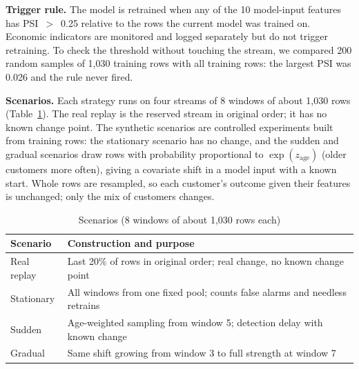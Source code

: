 \documentclass[conference]{IEEEtran}
\begin{document}
\textbf{Trigger rule.} The model is retrained when any of the 10 model-input features has PSI~$>$~0.25 relative to the rows the current model was trained on. Economic indicators are monitored and logged separately but do not trigger retraining. To check the threshold without touching the stream, we compared 200 random samples of 1,030 training rows with all training rows: the largest PSI was 0.026 and the rule never fired.

\textbf{Scenarios.} Each strategy runs on four streams of 8 windows of about 1,030 rows (Table~\ref{tab:scenarios}). The real replay is the reserved stream in original order; it has no known change point. The synthetic scenarios are controlled experiments built from training rows: the stationary scenario has no change, and the sudden and gradual scenarios draw rows with probability proportional to $\exp(z_{\text{age}})$ (older customers more often), giving a covariate shift in a model input with a known start. Whole rows are resampled, so each customer's outcome given their features is unchanged; only the mix of customers changes.

\begin{table}[t]
\caption{Scenarios (8 windows of about 1,030 rows each)}
\label{tab:scenarios}
\centering
\footnotesize
\begin{tabular}{@{}p{1.6cm}p{6.2cm}@{}}
\toprule
Scenario & Construction and purpose \\
\midrule
Real replay & Last 20\% of rows in original order; real change, no known change point \\
Stationary & All windows from one fixed pool; counts false alarms and needless retrains \\
Sudden & Age-weighted sampling from window 5; detection delay with known change \\
Gradual & Same shift growing from window 3 to full strength at window 7 \\
\bottomrule
\end{tabular}
\end{table}
\end{document}

